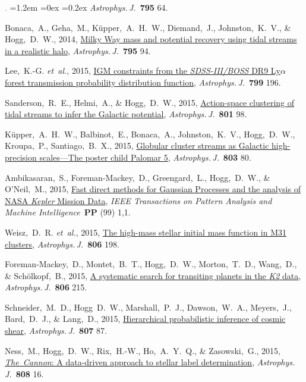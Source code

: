 \documentclass[10pt,letterpaper]{article}
\newcommand{\acronym}[1]{{\small{#1}}}
\newcommand{\foreign}[1]{\textsl{#1}}
\newcommand{\etal}{\foreign{et~al.}}
\newcommand{\project}[1]{\textsl{#1}}
\newcommand{\doi}[2]{\href{http://dx.doi.org/#1}{{#2}}}
\newcommand{\deemph}[1]{\textcolor{grey}{\footnotesize{#1}}}
\newcommand{\pubnumber}[1]{\deemph{{#1}.}}
\newcounter{refpubnum}
\newcommand{\hogglist}{%
    \rightmargin=0in
    \leftmargin=1.2em
    \topsep=0ex
    \partopsep=0pt
    \itemsep=0.2ex
    \parsep=0pt
    \itemindent=-1.0\leftmargin
    \listparindent=0.0\leftmargin
    \settowidth{\labelsep}{~}
    \usecounter{refpubnum}
  }
\begin{document}
\begin{list}{\pubnumber{\therefpubnum}}{\hogglist}
\textit{Astrophys.\,J.}\ \textbf{795} 64.
\item
Bonaca,~A., Geha,~M., K\"upper,~A.~H.~W., Diemand,~J., Johnston,~K.~V., \& Hogg,~D.~W., 2014,
\doi{10.1088/0004-637X/795/1/94}{Milky Way mass and potential recovery using tidal streams in a realistic halo},
\textit{Astrophys.\,J.}\ \textbf{795} 94.
\item 
Lee,~K.-G. \etal, 2015,
\doi{10.1088/0004-637X/799/2/196}{IGM constraints from the \project{\acronym{SDSS-III/BOSS}}
DR9 Ly{$\alpha$} forest transmission probability distribution function},
\textit{Astrophys.\,J.}\ \textbf{799} 196.
\item
Sanderson,~R.~E., Helmi,~A., \& Hogg,~D.~W., 2015,
\doi{10.1088/0004-637X/801/2/98}{Action-space clustering of tidal streams
to infer the Galactic potential},
\textit{Astrophys.\,J.}\ \textbf{801} 98.
\item
K\"upper,~A.~H.~W., Balbinot,~E., Bonaca,~A., Johnston,~K.~V.,
Hogg,~D.~W., Kroupa,~P., Santiago,~B.~X., 2015,
\doi{10.1088/0004-637X/803/2/80}{Globular cluster streams as
Galactic high-precision scales---The poster child Palomar 5},
\textit{Astrophys.\,J.}\ \textbf{803} 80.
\item
Ambikasaran,~S., Foreman-Mackey,~D., Greengard,~L., Hogg,~D.~W., \& O'Neil,~M., 2015,
\doi{10.1109/TPAMI.2015.2448083}{Fast direct methods for Gaussian Processes and the analysis of \acronym{NASA} \project{Kepler} Mission Data},
\textit{IEEE Transactions on Pattern Analysis and Machine Intelligence}\ \textbf{PP} (99) 1,1.
\item
Weisz,~D.~R. \etal, 2015,
\doi{10.1088/0004-637X/806/2/198}{The high-mass stellar initial mass function in M31 clusters},
\textit{Astrophys.\,J.}\ \textbf{806} 198.
\item
Foreman-Mackey,~D., Montet,~B.~T., Hogg,~D.~W., Morton,~T.~D.,
Wang,~D., \& Sch\"olkopf,~B., 2015,
\doi{10.1088/0004-637X/806/2/215}{A systematic search for transiting planets in the \project{K2} data},
\textit{Astrophys.\,J.}\ \textbf{806} 215.
\item
Schneider,~M.~D., Hogg~D.~W., Marshall,~P.~J., Dawson,~W.~A., Meyers,~J.,
Bard,~D.~J., \& Lang,~D., 2015,
\doi{10.1088/0004-637X/807/1/87}{Hierarchical probabilistic inference of cosmic shear},
\textit{Astrophys.\,J.}\ \textbf{807} 87.
\item
Ness,~M., Hogg,~D.~W., Rix,~H.-W., Ho,~A.~Y.~Q., \& Zasowski,~G., 2015,
\doi{10.1088/0004-637X/808/1/16}{\project{The~Cannon}: A data-driven
approach to stellar label determination},
\textit{Astrophys.\,J.}\ \textbf{808} 16.

\end{list}
\end{document}
